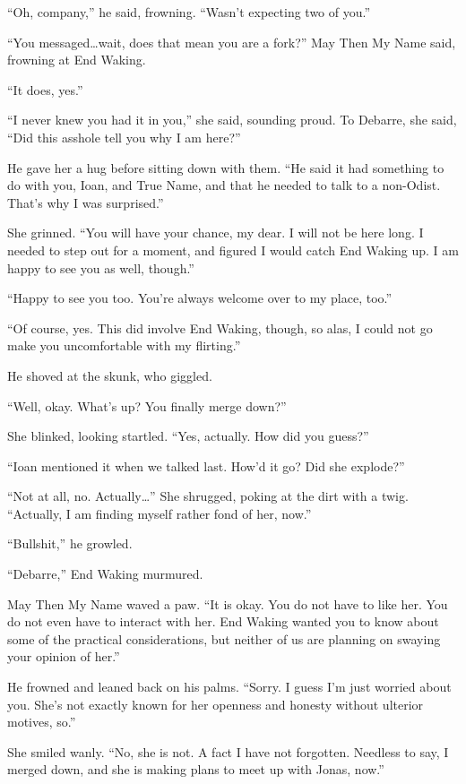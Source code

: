 ``Oh, company,'' he said, frowning. ``Wasn't expecting two of you.''

``You messaged\ldots wait, does that mean you are a fork?'' May Then My Name said, frowning at End Waking.

``It does, yes.''

``I never knew you had it in you,'' she said, sounding proud. To Debarre, she said, ``Did this asshole tell you why I am here?''

He gave her a hug before sitting down with them. ``He said it had something to do with you, Ioan, and True Name, and that he needed to talk to a non-Odist. That's why I was surprised.''

She grinned. ``You will have your chance, my dear. I will not be here long. I needed to step out for a moment, and figured I would catch End Waking up. I am happy to see you as well, though.''

``Happy to see you too. You're always welcome over to my place, too.''

``Of course, yes. This did involve End Waking, though, so alas, I could not go make you uncomfortable with my flirting.''

He shoved at the skunk, who giggled.

``Well, okay. What's up? You finally merge down?''

She blinked, looking startled. ``Yes, actually. How did you guess?''

``Ioan mentioned it when we talked last. How'd it go? Did she explode?''

``Not at all, no. Actually\ldots{}'' She shrugged, poking at the dirt with a twig. ``Actually, I am finding myself rather fond of her, now.''

``Bullshit,'' he growled.

``Debarre,'' End Waking murmured.

May Then My Name waved a paw. ``It is okay. You do not have to like her. You do not even have to interact with her. End Waking wanted you to know about some of the practical considerations, but neither of us are planning on swaying your opinion of her.''

He frowned and leaned back on his palms. ``Sorry. I guess I'm just worried about you. She's not exactly known for her openness and honesty without ulterior motives, so.''

She smiled wanly. ``No, she is not. A fact I have not forgotten. Needless to say, I merged down, and she is making plans to meet up with Jonas, now.''

